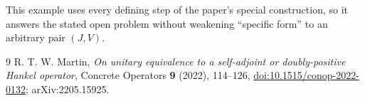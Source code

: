 \documentclass[11pt]{article}
\begin{document}
This example uses every defining step of the paper's special construction,
so it answers the stated open problem without weakening ``specific form'' to
an arbitrary pair \((J,V)\).

\begin{thebibliography}{9}
R. T. W. Martin,
\emph{On unitary equivalence to a self-adjoint or doubly-positive Hankel
operator}, Concrete Operators \textbf{9} (2022), 114--126,
\href{https://doi.org/10.1515/conop-2022-0132}{doi:10.1515/conop-2022-0132};
arXiv:2205.15925.
\end{thebibliography}
\end{document}

